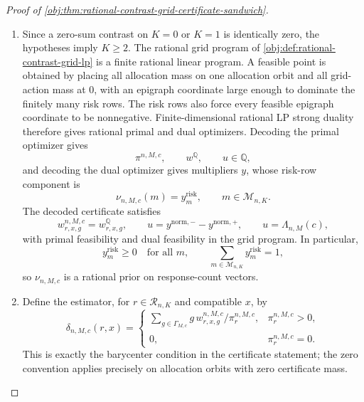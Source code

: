 \begin{proof}[Proof of \cref{obj:thm:rational-contrast-grid-certificate-sandwich}]
\begin{enumerate}
\item Since a zero-sum contrast on \(K=0\) or \(K=1\) is identically zero, the hypotheses imply \(K\geq2\).  The rational grid program of \cref{obj:def:rational-contrast-grid-lp} is a finite rational linear program.  A feasible point is obtained by placing all allocation mass on one allocation orbit and all grid-action mass at \(0\), with an epigraph coordinate large enough to dominate the finitely many risk rows.  The risk rows also force every feasible epigraph coordinate to be nonnegative.  Finite-dimensional rational LP strong duality therefore gives rational primal and dual optimizers.  Decoding the primal optimizer gives
\[
\pi^{n,M,c},\qquad w^{\mathbb Q},\qquad u\in\mathbb Q,
\]
and decoding the dual optimizer gives multipliers \(y\), whose risk-row component is
\[
\nu_{n,M,c}(m)=y_m^{\mathrm{risk}},
\qquad m\in\mathcal M_{n,K}.
\]
The decoded certificate satisfies
\[
w^{n,M,c}_{r,x,g}=w^{\mathbb Q}_{r,x,g},
\qquad
u=y^{\mathrm{norm},-}-y^{\mathrm{norm},+},
\qquad
u=\Lambda_{n,M}(c),
\]
with primal feasibility and dual feasibility in the grid program.  In particular,
\[
y_m^{\mathrm{risk}}\geq0
\quad\text{for all }m,
\qquad
\sum_{m\in\mathcal M_{n,K}}y_m^{\mathrm{risk}}=1,
\]
so \(\nu_{n,M,c}\) is a rational prior on response-count vectors. %

\item Define the estimator, for \(r\in\mathcal R_{n,K}\) and compatible \(x\), by
\[
\delta_{n,M,c}(r,x)=
\begin{cases}
\displaystyle
\sum_{g\in\Gamma_{M,c}} g\,w_{r,x,g}^{n,M,c}/\pi_r^{n,M,c},
& \pi_r^{n,M,c}>0,\\[0.7em]
0,& \pi_r^{n,M,c}=0.
\end{cases}
\]
This is exactly the barycenter condition in the certificate statement; the zero convention applies precisely on allocation orbits with zero certificate mass. %


\end{enumerate}
\end{proof}
